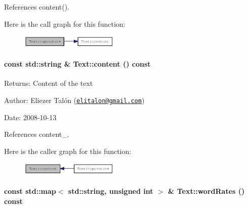 References content().

Here is the call graph for this function:\nopagebreak
\begin{figure}[H]
\begin{center}
\leavevmode
\includegraphics[width=133pt]{class_text_c8887fb224e0402448ede4f3b9f7452d_cgraph}
\end{center}
\end{figure}
\hypertarget{class_text_8b6ac381338c5b3f719600b5f9be222c}{
\paragraph[content]{\setlength{\rightskip}{0pt plus 5cm}const std::string \& Text::content () const}\hfill}
\label{class_text_8b6ac381338c5b3f719600b5f9be222c}


\begin{Desc}
\item[Returns:]Content of the text\end{Desc}
\begin{Desc}
\item[Author:]Eliezer Talón (\href{mailto:elitalon@gmail.com}{\tt elitalon@gmail.com}) \end{Desc}
\begin{Desc}
\item[Date:]2008-10-13 \end{Desc}


References content\_\-.

Here is the caller graph for this function:\nopagebreak
\begin{figure}[H]
\begin{center}
\leavevmode
\includegraphics[width=133pt]{class_text_8b6ac381338c5b3f719600b5f9be222c_icgraph}
\end{center}
\end{figure}
\hypertarget{class_text_f1588ae161a4c4894b2ce1a1d29ebc22}{
\paragraph[wordRates]{\setlength{\rightskip}{0pt plus 5cm}const std::map$<$ std::string, unsigned int $>$ \& Text::wordRates () const}\hfill}
\label{class_text_f1588ae161a4c4894b2ce1a1d29ebc22}


